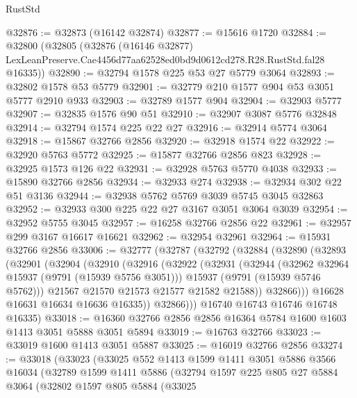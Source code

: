 \begin{lexlean}{RustStd}
\begin{coremodule}
@32876 := @32873 (@16142 @32874)
@32877 := @15616 @1720
@32884 := @32800
    (@32805
      (@32876
        (@16146 @32877)
        LexLeanPreserve.Cae4456d77aa62528ed0bd9d0612cd278.R28.RustStd.fal28
        @16335))
@32890 := @32794 @1578 @225 @53 @27 @5779 @3064
@32893 := @32802 @1578 @53 @5779
@32901 := @32779 @210 @1577 @904 @53 @3051 @5777 @2910 @933
@32903 := @32789 @1577 @904
@32904 := @32903 @5777
@32907 := @32835 @1576 @90 @51
@32910 := @32907 @3087 @5776 @32848
@32914 := @32794 @1574 @225 @22 @27
@32916 := @32914 @5774 @3064
@32918 := @15867 @32766 @2856
@32920 := @32918 @1574 @22
@32922 := @32920 @5763 @5772
@32925 := @15877 @32766 @2856 @823
@32928 := @32925 @1573 @126 @22
@32931 := @32928 @5763 @5770 @4038
@32933 := @15890 @32766 @2856
@32934 := @32933 @274
@32938 := @32934 @302 @22 @51 @3136
@32944 := @32938 @5762 @5769 @3039 @5745 @3045 @32863
@32952 := @32933 @300 @225 @22 @27 @3167 @3051 @3064 @3039
@32954 := @32952 @5755 @3045
@32957 := @16258 @32766 @2856 @22
@32961 := @32957 @299 @3167 @16617 @16621
@32962 := @32954 @32961
@32964 := @15931 @32766 @2856
@33006 := @32777
    (@32787
      (@32792
        (@32884
          (@32890
            (@32893
              (@32901
                (@32904
                  (@32910
                    (@32916
                      (@32922
                        (@32931
                          (@32944
                            (@32962 @32964 @15937 (@9791 (@15939 @5756 @3051)))
                            @15937
                            (@9791 (@15939 @5746 @5762)))
                          @21567
                          @21570
                          @21573
                          @21577
                          @21582
                          @21588))
                      @32866)))
                @16628
                @16631
                @16634
                @16636
                @16335))
            @32866)))
      @16740
      @16743
      @16746
      @16748
      @16335)
@33018 := @16360 @32766 @2856 @2856 @16364 @5784 @1600 @1603 @1413 @3051 @5888 @3051 @5894
@33019 := @16763 @32766
@33023 := @33019 @1600 @1413 @3051 @5887
@33025 := @16019 @32766 @2856
@33274 := @33018
    (@33023
      (@33025
        @552
        @1413
        @1599
        @1411
        @3051
        @5886
        @3566
        @16034
        (@32789
          @1599
          @1411
          @5886
          (@32794
            @1597
            @225
            @805
            @27
            @5884
            @3064
            (@32802
              @1597
              @805
              @5884
              (@33025

\end{coremodule}
\end{lexlean}
